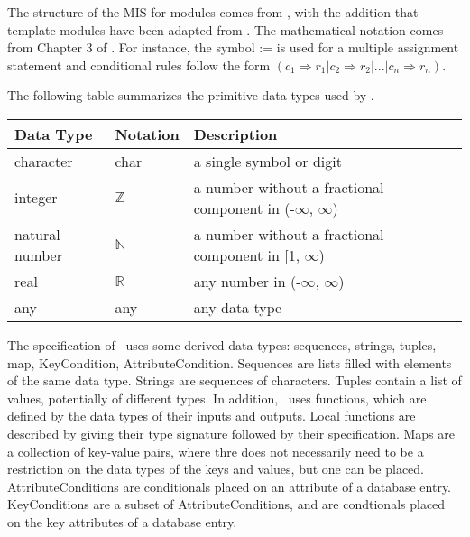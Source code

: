 \documentclass[12pt, titlepage]{article}
\begin{document}

The structure of the MIS for modules comes from \citet{HoffmanAndStrooper1995},
with the addition that template modules have been adapted from
\cite{GhezziEtAl2003}.  The mathematical notation comes from Chapter 3 of
\citet{HoffmanAndStrooper1995}.  For instance, the symbol := is used for a
multiple assignment statement and conditional rules follow the form $(c_1
\Rightarrow r_1 | c_2 \Rightarrow r_2 | ... | c_n \Rightarrow r_n )$.

The following table summarizes the primitive data types used by \progname.

\begin{center}
  \renewcommand{\arraystretch}{1.2}
  \noindent
  \begin{tabular}{l l p{7.5cm}}
    \toprule
    \textbf{Data Type} & \textbf{Notation} & \textbf{Description}\\
    \midrule
    character & char & a single symbol or digit\\
    integer & $\mathbb{Z}$ & a number without a fractional component
    in (-$\infty$, $\infty$) \\
    natural number & $\mathbb{N}$ & a number without a fractional
    component in [1, $\infty$) \\
    real & $\mathbb{R}$ & any number in (-$\infty$, $\infty$)\\
    any & any & any data type\\
    \bottomrule
  \end{tabular}
\end{center}

\noindent
The specification of \progname \ uses some derived data types:
sequences, strings, tuples, map, KeyCondition, AttributeCondition. Sequences
are lists filled with elements of the same data type. Strings
are sequences of characters. Tuples contain a list of values, potentially of
different types. In addition, \progname \ uses functions, which
are defined by the data types of their inputs and outputs. Local functions are
described by giving their type signature followed by their specification. Maps
are a collection of key-value pairs, where thre does not necessarily need to
be a restriction on the data types of the keys and values, but one can be
placed. AttributeConditions are conditionals placed on an attribute of a
database entry. KeyConditions are a subset of AttributeConditions, and are
condtionals placed on the key attributes of a database entry.
\end{document}
